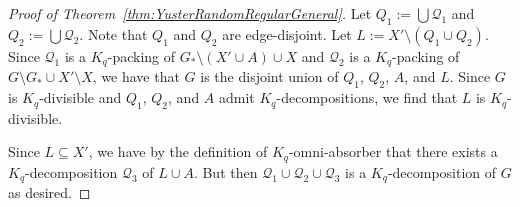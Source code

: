 \documentclass[11pt]{article}
\numberwithin{equation}{section}
\newcommand{\mc}[1]{\mathcal{#1}}
\newcounter{i}
\theoremstyle{plain}
\theoremstyle{plain} %
\theoremstyle{definition}
\newtheorem{definition}[thm]{Definition}
\newcommand{\cQ}{\mathcal{Q}}
\begin{document}
\begin{proof}[Proof of Theorem~\ref{thm:YusterRandomRegularGeneral}]
Let $Q_1:= \bigcup \mc{Q}_1$ and $Q_2:= \bigcup \mc{Q}_2$. Note that $Q_1$ and $Q_2$ are edge-disjoint. Let $L := X'\setminus (Q_1\cup Q_2)$. Since $\mathcal{Q}_1$ is a $K_q$-packing of $G_*\setminus (X' \cup A) \cup X$ and $\cQ_2$ is a $K_q$-packing of $G \setminus G_* \cup X' \setminus X$, we have that $G$ is the disjoint union of $Q_1$, $Q_2$, $A$, and $L$.  Since $G$ is $K_q$-divisible and $Q_1$, $Q_2$, and $A$ admit $K_q$-decompositions, we find that $L$ is $K_q$-divisible. 

Since $L\subseteq X'$, we have by the definition of $K_q$-omni-absorber that there exists a $K_q$-decomposition $\mathcal{Q}_3$ of $L\cup A$. But then $\mathcal{Q}_1\cup \mathcal{Q}_2\cup \mc{Q}_3$ is a $K_q$-decomposition of $G$ as desired.
\end{proof}

\end{document}
